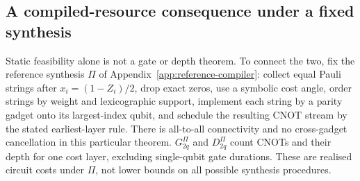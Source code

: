 \subsection{A compiled-resource consequence under a fixed synthesis}
\label{sec:compiled-phase-corollary}
Static feasibility alone is not a gate or depth theorem. To connect the two,
fix the reference synthesis $\Pi$ of
Appendix~\ref{app:reference-compiler}: collect equal Pauli strings after
$x_i=(1-Z_i)/2$, drop exact zeros, use a symbolic cost angle, order strings
by weight and lexicographic support, implement each string by a parity
gadget onto its largest-index qubit, and schedule the resulting CNOT stream
by the stated earliest-layer rule. There is all-to-all connectivity and no
cross-gadget cancellation in this particular theorem. $G_{2q}^\Pi$ and
$D_{2q}^\Pi$ count CNOTs and their depth for one cost layer, excluding
single-qubit gate durations. These are realised circuit costs under $\Pi$,
not lower bounds on all possible synthesis procedures.

